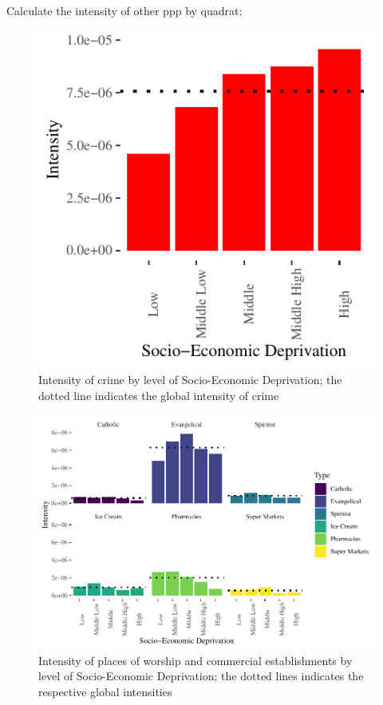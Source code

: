 \documentclass[smallextended]{svjour3}       %
\begin{document}
Calculate the intensity of other ppp by quadrat:

\begin{figure}
\centering
\includegraphics{Moral_Communities_and_Crime_v1_files/figure-latex/plot-crime-quadrat-1.pdf}
\caption{\label{fig:plot-crime-quadrat}Intensity of crime by level of
Socio-Economic Deprivation; the dotted line indicates the global
intensity of crime}
\end{figure}

\begin{figure}
\centering
\includegraphics{Moral_Communities_and_Crime_v1_files/figure-latex/plot-events-quadrat-1.pdf}
\caption{\label{fig:plot-events-quadrat}Intensity of places of worship
and commercial establishments by level of Socio-Economic Deprivation;
the dotted lines indicates the respective global intensities}
\end{figure}
\end{document}
